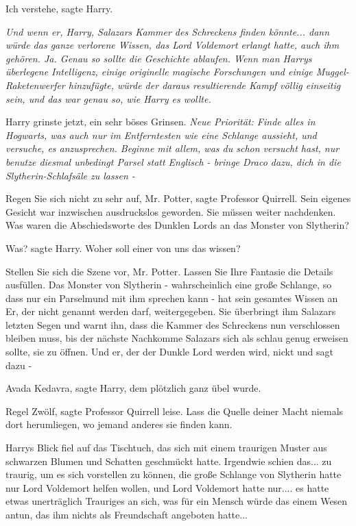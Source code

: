 \glqq{}Ich verstehe\grqq{}, sagte Harry.

\emph{Und wenn er, Harry, Salazars Kammer des Schreckens finden könnte... dann
würde das ganze verlorene Wissen, das Lord Voldemort erlangt hatte, auch ihm
gehören. Ja. Genau so sollte die Geschichte ablaufen. Wenn man Harrys überlegene
Intelligenz, einige originelle magische Forschungen und einige
Muggel-Raketenwerfer hinzufügte, würde der daraus resultierende Kampf völlig
einseitig sein, und das war genau so, wie Harry es wollte.}

Harry grinste jetzt, ein sehr böses Grinsen.
\emph{Neue Priorität: Finde alles in Hogwarts, was auch nur im Entferntesten wie
eine Schlange aussieht, und versuche, es anzusprechen. Beginne mit allem, was
du schon versucht hast, nur benutze diesmal unbedingt Parsel statt Englisch -
bringe Draco dazu, dich in die Slytherin-Schlafsäle zu lassen -}

\glqq{}Regen Sie sich nicht zu sehr auf, Mr. Potter\grqq{}, sagte Professor
Quirrell. Sein eigenes Gesicht war inzwischen ausdruckslos geworden. \glqq{}Sie
müssen weiter nachdenken. Was waren die Abschiedsworte des Dunklen Lords an das
Monster von Slytherin?\grqq{}

\glqq{}Was?\grqq{} sagte Harry. \glqq{}Woher soll einer von uns das wissen?\grqq{}

\glqq{}Stellen Sie sich die Szene vor, Mr. Potter. Lassen Sie Ihre Fantasie die
Details ausfüllen. Das Monster von Slytherin - wahrscheinlich eine große
Schlange, so dass nur ein Parselmund mit ihm sprechen kann - hat sein gesamtes
Wissen an Er, der nicht genannt werden darf, weitergegeben. Sie überbringt ihm
Salazars letzten Segen und warnt ihn, dass die Kammer des Schreckens nun
verschlossen bleiben muss, bis der nächste Nachkomme Salazars sich als schlau
genug erweisen sollte, sie zu öffnen. Und er, der der Dunkle Lord werden wird,
nickt und sagt dazu -\grqq{}

\glqq{}Avada Kedavra\grqq{}, sagte Harry, dem plötzlich ganz übel wurde.

\glqq{}Regel Zwölf\grqq{}, sagte Professor Quirrell leise. \glqq{}Lass die Quelle
deiner Macht niemals dort herumliegen, wo jemand anderes sie finden kann.\grqq{}

Harrys Blick fiel auf das Tischtuch, das sich mit einem traurigen Muster aus
schwarzen Blumen und Schatten geschmückt hatte. Irgendwie schien das... zu
traurig, um es sich vorstellen zu können, die große Schlange von Slytherin hatte
nur Lord Voldemort helfen wollen, und Lord Voldemort hatte nur.... es hatte
etwas unerträglich Trauriges an sich, was für ein Mensch würde das einem Wesen
antun, das ihm nichts als Freundschaft angeboten hatte...

